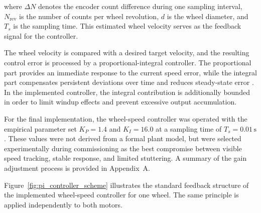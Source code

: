 where $\Delta N$ denotes the encoder count difference during one sampling interval, $N_{\mathrm{rev}}$ is the number of counts per wheel revolution, $d$ is the wheel diameter, and $T_s$ is the sampling time. This estimated wheel velocity serves as the feedback signal for the controller.

The wheel velocity is compared with a desired target velocity, and the resulting control error is processed by a proportional-integral controller. The proportional part provides an immediate response to the current speed error, while the integral part compensates persistent deviations over time and reduces steady-state error \cite{schroeder2015antriebe}. In the implemented controller, the integral contribution is additionally bounded in order to limit windup effects and prevent excessive output accumulation.

For the final implementation, the wheel-speed controller was operated with the empirical parameter set $K_P = 1.4$ and $K_I = 16.0$ at a sampling time of $T_s = 0.01\,\mathrm{s}$. These values were not derived from a formal plant model, but were selected experimentally during commissioning as the best compromise between visible speed tracking, stable response, and limited stuttering. A summary of the gain adjustment process is provided in Appendix~A.

Figure~\ref{fig:pi_controller_scheme} illustrates the standard feedback structure of the implemented wheel-speed controller for one wheel. The same principle is applied independently to both motors.

